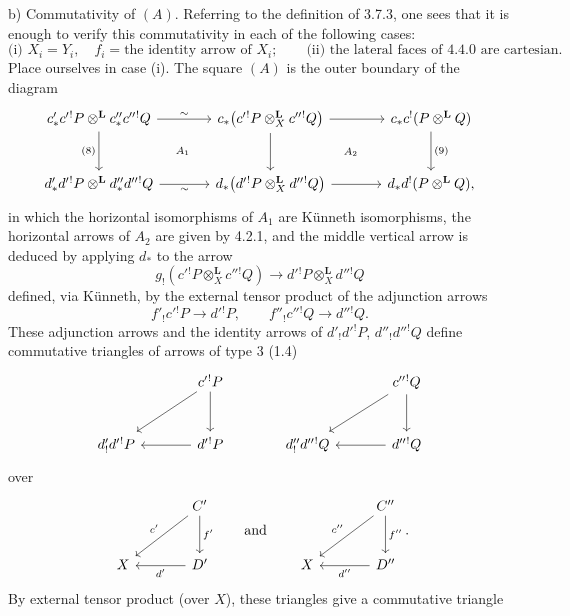\begin{prooftext}[Proof]
b) Commutativity of $(A)$. Referring to the definition of 3.7.3, one sees that it is enough to verify this commutativity in each of the following cases:
\[
\text{(i) } X_i=Y_i,\quad f_i=\text{the identity arrow of }X_i;\qquad
\text{(ii) the lateral faces of 4.4.0 are cartesian.}
\]
Place ourselves in case (i). The square $(A)$ is the outer boundary of the diagram
\[
\begin{tikzcd}[column sep=large,row sep=large]
c'_*c'{}^!P\otimes^{\mathbf L}c''_*c''{}^!Q
 \arrow[r,"\sim"] \arrow[d,"(8)"'] &
c_*\bigl(c'{}^!P\otimes_X^{\mathbf L}c''{}^!Q\bigr)
 \arrow[r] \arrow[d] &
c_*c^!(P\otimes^{\mathbf L}Q)\arrow[d,"(9)"]\\
d'_*d'{}^!P\otimes^{\mathbf L}d''_*d''{}^!Q
 \arrow[r,"\sim"'] &
d_*\bigl(d'{}^!P\otimes_X^{\mathbf L}d''{}^!Q\bigr)
 \arrow[r] &
d_*d^!(P\otimes^{\mathbf L}Q),
\arrow[from=1-1,to=2-2,phantom,"\scriptstyle A_1"]
\arrow[from=1-2,to=2-3,phantom,"\scriptstyle A_2"]
\end{tikzcd}
\]
in which the horizontal isomorphisms of %
$A_1$ are Künneth isomorphisms, the horizontal arrows of $A_2$ are given by 4.2.1, and the middle vertical arrow is deduced by applying $d_*$ to the arrow
\[
g_!(c'{}^!P\otimes_X^{\mathbf L}c''{}^!Q)\longrightarrow d'{}^!P\otimes_X^{\mathbf L}d''{}^!Q
\]
defined, via Künneth, by the external tensor product of the adjunction arrows
\[
f'_!c'{}^!P\longrightarrow d'{}^!P,\qquad
f''_!c''{}^!Q\longrightarrow d''{}^!Q.
\]
These adjunction arrows and the identity arrows of $d'_!d'{}^!P$, $d''_!d''{}^!Q$ define commutative triangles of arrows of type $3$ (1.4)
\[
\begin{tikzcd}[column sep=large,row sep=large]
& c'{}^!P \arrow[d] \arrow[dl] & & c''{}^!Q \arrow[d]\arrow[dl]\\
d'_!d'{}^!P & d'{}^!P\arrow[l] & d''_!d''{}^!Q & d''{}^!Q\arrow[l]
\end{tikzcd}
\]
over
\[
\begin{tikzcd}[column sep=large,row sep=large]
& C' \arrow[d,"f'"] \arrow[dl,"c'"']\\
X & D'\arrow[l,"d'"]
\end{tikzcd}
\qquad\text{and}\qquad
\begin{tikzcd}[column sep=large,row sep=large]
& C'' \arrow[d,"f''"] \arrow[dl,"c''"']\\
X & D''\arrow[l,"d''"]
\end{tikzcd}.
\]
By external tensor product (over $X$), these triangles give a commutative triangle

\end{prooftext}
